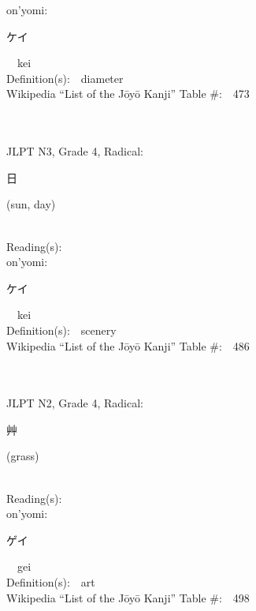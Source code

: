 \begin{multicols}{2}
{\hspace*{1em}}on'yomi:\ \ \\
{\hspace*{2em}}{\begin{CJK}{UTF8}{min} ケイ \end{CJK}}\ \ kei\ \ \\
Definition(s):\ \ diameter \\
Wikipedia ``List of the J\=oy\=o Kanji'' Table \#:\ \ 473 \\
\ \ \\
{\fontsize{34pt}{40pt}  }\ \ \\  %
{JLPT N3, Grade 4, Radical:\ \ {\begin{CJK}{UTF8}{min} 日 \end{CJK}} (sun, day) } \\
Reading(s):\ \ \\
{\hspace*{1em}}on'yomi:\ \ \\
{\hspace*{2em}}{\begin{CJK}{UTF8}{min} ケイ \end{CJK}}\ \ kei\ \ \\
Definition(s):\ \ scenery \\
Wikipedia ``List of the J\=oy\=o Kanji'' Table \#:\ \ 486 \\
\ \ \\
{\fontsize{34pt}{40pt}  }\ \ \\  %
{JLPT N2, Grade 4, Radical:\ \ {\begin{CJK}{UTF8}{min} 艸 \end{CJK}} (grass) } \\
Reading(s):\ \ \\
{\hspace*{1em}}on'yomi:\ \ \\
{\hspace*{2em}}{\begin{CJK}{UTF8}{min} ゲイ \end{CJK}}\ \ gei\ \ \\
Definition(s):\ \ art \\
Wikipedia ``List of the J\=oy\=o Kanji'' Table \#:\ \ 498 \\

\end{multicols}
